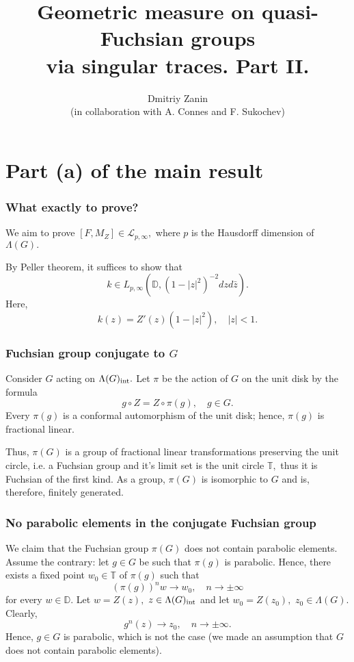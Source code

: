 \documentclass{beamer}
\title[Geometric measure via singular traces]{Geometric measure on quasi-Fuchsian groups\\ via singular traces. Part II.}
\author[Dmitriy Zanin]{Dmitriy Zanin\\
(in collaboration with A. Connes and F. Sukochev)}
\institute[]{University of New South Wales}
\theoremstyle{definition}
\begin{document}
\begin{frame} 
\titlepage
\end{frame}

\section{Part (a) of the main result}

\begin{frame}
\frametitle{What exactly to prove?}

We aim to prove $[F,M_Z]\in\mathcal{L}_{p,\infty},$ where $p$ is the Hausdorff dimension of $\Lambda(G).$

By Peller theorem, it suffices to show that
$$k\in L_{p,\infty}(\mathbb{D},(1-|z|^2)^{-2}dzd\bar{z}).$$
Here,
$$k(z)=Z'(z)(1-|z|^2),\quad |z|<1.$$


\end{frame}

\begin{frame}
\frametitle{Fuchsian group conjugate to $G$}

Consider $G$ acting on $\Lambda(G)_{{\rm int}}.$ Let $\pi$ be the action of $G$ on the unit disk by the
formula
$$g\circ Z=Z\circ\pi(g),\quad g\in G.$$
Every $\pi(g)$ is a conformal automorphism of the unit disk; hence, $\pi(g)$ is fractional linear.

Thus, $\pi(G)$ is a group of fractional linear transformations preserving the unit circle, i.e. a Fuchsian group and it’s limit set is the unit circle $\mathbb{T},$ thus it is Fuchsian of the first kind. As a group, $\pi(G)$ is isomorphic to $G$ and is, therefore, finitely generated.
\end{frame}


\begin{frame}
\frametitle{No parabolic elements in the conjugate Fuchsian group}



We claim that the Fuchsian group $\pi(G)$ does not contain parabolic elements. Assume the contrary: let $g\in G$ be such that $\pi(g)$ is parabolic. Hence, there exists a fixed point $w_0\in\mathbb{T}$ of $\pi(g)$ such that
$$(\pi(g))^nw\to w_0,\quad n\to\pm\infty$$
for every $w\in\mathbb{D}.$ Let $w=Z(z),$ $z\in\Lambda(G)_{{\rm int}}$ and let $w_0=Z(z_0),$ $z_0\in\Lambda(G).$ Clearly, 
$$g^n(z)\to z_0,\quad n\to\pm\infty.$$
Hence, $g\in G$ is parabolic, which is not the case (we made an assumption that $G$ does not contain parabolic elements).
\end{frame}
\end{document}
